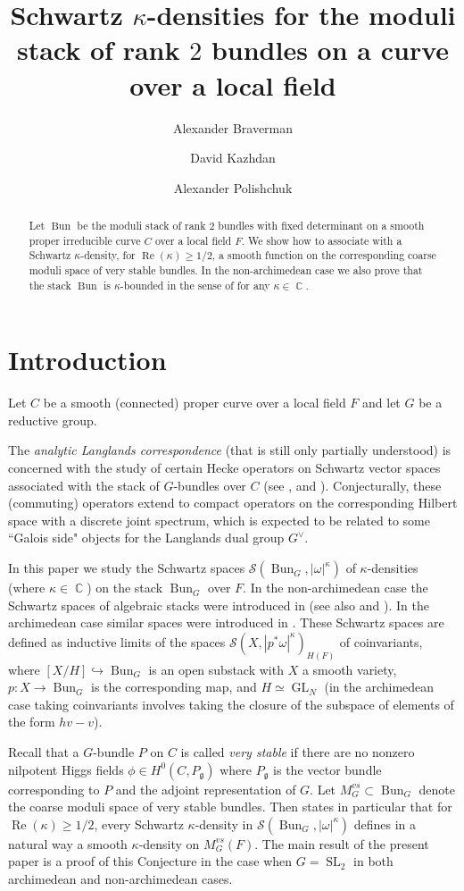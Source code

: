 \documentclass[12pt,reqno]{amsart}
\title[Schwartz $\kappa$-densities]
{Schwartz $\kappa$-densities for the moduli stack of rank $2$ bundles on a curve over a local field}
\author{Alexander Braverman}
\author{David Kazhdan}
\author{Alexander Polishchuk}
\DeclareMathOperator\C{\mathbb C}
\theoremstyle{definition}
\theoremstyle{remark}
\numberwithin{equation}{section}
\newcommand{\hra}{\hookrightarrow}
\renewcommand{\SS}{{\mathcal S}}
\newcommand{\sub}{\subset}
\newcommand{\om}{\omega}
\newcommand{\GL}{\operatorname{GL}}
\newcommand{\SL}{{\operatorname{SL}}}
\newcommand{\fg}{{\mathfrak g}}
\newcommand{\Bun}{{\operatorname{Bun}}}
\renewcommand{\Re}{{\operatorname{Re}}}
\begin{document}
\begin{abstract}
Let $\Bun$ be the moduli stack  of rank $2$ bundles with fixed determinant on a smooth proper irreducible curve $C$ over a local field $F$.
We show how to associate with a Schwartz $\kappa$-density,
for $\Re(\kappa)\ge 1/2$, 
a smooth function on the corresponding coarse moduli space of very stable bundles.
In the non-archimedean case we also prove that the stack $\Bun$ is $\kappa$-bounded in the sense of \cite[Def.\ 2.10]{BK}  for any $\kappa\in\C$.
\end{abstract}

\maketitle

\section{Introduction}

Let $C$ be a smooth (connected) proper curve over a local field $F$ and let $G$ be a reductive group. 

The {\it analytic Langlands correspondence} (that is still only partially understood)
is concerned with the study of certain Hecke operators on Schwartz vector spaces associated with the stack of $G$-bundles over $C$ (see \cite{EFK1, EFK2, EFK3},
\cite{BK} and \cite{BKP}). Conjecturally, these (commuting) operators extend to compact operators on the corresponding Hilbert space with
a discrete joint spectrum, which is expected to be related to some ``Galois side" objects for the Langlands dual group $G^\vee$.

In this paper we study the Schwartz spaces $\SS(\Bun_G,|\om|^\kappa)$ of $\kappa$-densities (where $\kappa\in\C$) on the stack $\Bun_G$ over $F$. In the non-archimedean case
the Schwartz spaces of algebraic stacks were introduced in \cite{GK} (see also \cite{BK} and \cite{BKP}). In the archimedean case similar spaces were introduced in
\cite{Sak}. These Schwartz spaces are defined as inductive limits of the spaces $\SS(X,|p^*\om|^\kappa)_{H(F)}$ of coinvariants, where $[X/H]\hra \Bun_G$ is an open substack
with $X$ a smooth variety, $p:X\to\Bun_G$ is the corresponding map, and $H\simeq \GL_N$ (in the archimedean case taking coinvariants involves taking the closure of
the subspace of elements of the form $hv-v$).

Recall that a $G$-bundle $P$ on $C$ is called {\it very stable} if there are no nonzero nilpotent Higgs fields $\phi\in H^0(C,P_{\fg})$ where
$P_{\fg}$ is the vector bundle corresponding to $P$ and the adjoint representation of $G$. 
Let $M_G^{vs}\sub \Bun_G$ denote the coarse moduli space of very stable bundles. Then \cite[Conjecture 3.5(1)]{BK} states in particular that for $\operatorname{Re}(\kappa)\ge 1/2$, 
every Schwartz $\kappa$-density in $\SS(\Bun_G,|\om|^\kappa)$ defines in a natural way
a smooth $\kappa$-density on $M_G^{vs}(F)$.
The main result of the present paper is a proof of this Conjecture in the case when $G=\SL_2$ in both archimedean and non-archimedean cases. 
\end{document}
